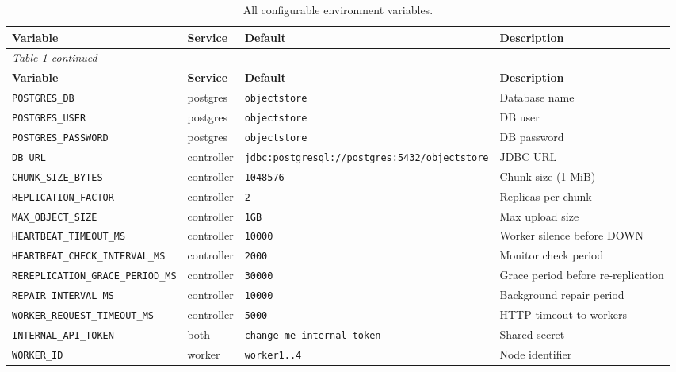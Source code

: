 \documentclass[12pt,a4paper]{report}
\begin{document}
\begin{longtable}{llll}
  \caption{All configurable environment variables.} \label{tab:env-vars} \\
  \toprule
  \textbf{Variable} & \textbf{Service} & \textbf{Default} & \textbf{Description} \\
  \midrule
  \endfirsthead
  \multicolumn{4}{l}{\small\textit{Table \ref{tab:env-vars} continued}} \\
  \toprule
  \textbf{Variable} & \textbf{Service} & \textbf{Default} & \textbf{Description} \\
  \midrule
  \endhead
  \texttt{POSTGRES\_DB}                  & postgres    & \texttt{objectstore} & Database name \\
  \texttt{POSTGRES\_USER}                & postgres    & \texttt{objectstore} & DB user \\
  \texttt{POSTGRES\_PASSWORD}            & postgres    & \texttt{objectstore} & DB password \\
  \texttt{DB\_URL}                       & controller  & \texttt{jdbc:postgresql://postgres:5432/objectstore} & JDBC URL \\
  \texttt{CHUNK\_SIZE\_BYTES}            & controller  & \texttt{1048576}     & Chunk size (1 MiB) \\
  \texttt{REPLICATION\_FACTOR}           & controller  & \texttt{2}           & Replicas per chunk \\
  \texttt{MAX\_OBJECT\_SIZE}             & controller  & \texttt{1GB}         & Max upload size \\
  \texttt{HEARTBEAT\_TIMEOUT\_MS}        & controller  & \texttt{10000}       & Worker silence before DOWN \\
  \texttt{HEARTBEAT\_CHECK\_INTERVAL\_MS}& controller  & \texttt{2000}        & Monitor check period \\
  \texttt{REREPLICATION\_GRACE\_PERIOD\_MS} & controller & \texttt{30000}    & Grace period before re-replication \\
  \texttt{REPAIR\_INTERVAL\_MS}          & controller  & \texttt{10000}       & Background repair period \\
  \texttt{WORKER\_REQUEST\_TIMEOUT\_MS}  & controller  & \texttt{5000}        & HTTP timeout to workers \\
  \texttt{INTERNAL\_API\_TOKEN}          & both        & \texttt{change-me-internal-token} & Shared secret \\
  \texttt{WORKER\_ID}                    & worker      & \texttt{worker1..4}  & Node identifier \\

\end{longtable}
\end{document}
